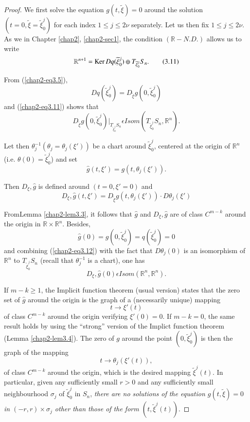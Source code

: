 \begin{proof}
We first solve the equation $g(t, \widetilde{\xi}) = 0$ around the
solution $(t = 0, \widetilde{\xi} = \widetilde{\xi}_{0}^{j})$ for each
index $1 \leq j \leq 2\nu$ separately. Let us then fix $1 \leq j \leq
2\nu$. As we in Chapter \ref{chap2}, \ref{chap2-sec1}, the condition
$(\mathbb{R}-N.D.)$ allows us to write
\begin{equation*}
\mathbb{R}^{n+1} = \operatorname{Ker} Dq (\widetilde{\xi}_{0}^{j}) \oplus
T_{\widetilde{\xi}_{0}^{j}} S_{n}.\tag{3.11}\label{chap2-eq3.11}
\end{equation*}

From (\ref{chap2-eq3.5}),
$$
Dq(\widetilde{\xi}_{0}^{j}) = D_{\widetilde{\xi}}g(0, \widetilde{\xi}_{0}^{j})
$$
and (\ref{chap2-eq3.11}) shows that
\begin{equation*}
D_{\widetilde{\xi}}g(0, \widetilde{\xi}_{0}^{j}) |_{
T_{\widetilde{\xi}_{0}^{j}} S_{n}} \epsilon Isom
(T_{\widetilde{\xi}_{0}^{j}} S_{n},
\mathbb{R}^{n}).\tag{3.12}\label{chap2-eq3.12}
\end{equation*}

Let then $\theta_{j}^{-1} (\theta_{j} = \theta_{j}(\xi'))$ be a chart
around $\widetilde{\xi}_{0}^{j}$, centered at the origin of
$\mathbb{R}^{n}$ (i.e. $\theta(0) = \widetilde{\xi}_{0}^{j}$) and set
$$
\hat{g}(t, \xi') = g(t, \theta_{j}(\xi')).
$$

Then $D_{\xi}, \hat{g}$ is defined around $(t = 0, \xi' = 0)$ and
$$
D_{\xi}, \hat{g}(t, \xi') = D_{\widetilde{\xi}}g(t, \theta_{j}(\xi'))
\cdot D\theta_{j}(\xi')
$$

From\pageoriginale Lemma \ref{chap2-lem3.3}, it follows that $\hat{g}$
and $D_{\xi}, \hat{g}$ are of class $C^{m-k}$ around the origin in
$\mathbb{R} \times \mathbb{R}^{n}$. Besides,
$$
\hat{g}(0) = g(0, \widetilde{\xi}_{0}^{j}) =
q(\widetilde{\xi}_{0}^{j}) = 0
$$
and combining (\ref{chap2-eq3.12}) with the fact that $D\theta_{j}(0)$
is an isomorphism of $\mathbb{R}^{n}$ to $T_{\widetilde{\xi}_{0}^{j}}
S_{n}$ (recall that $\theta_{j}^{-1}$ is a chart), one has
$$
D_{\xi}, \hat{g}(0) \epsilon Isom (\mathbb{R}^{n}, \mathbb{R}^{n}).
$$

If $m - k \geq 1$, the Implicit function theorem (usual version)
states that the zero set of $\hat{g}$ around the origin is the graph
of a (necessarily unique) mapping
$$
t \to \xi'(t)
$$
of class $C^{m-k}$ around the origin verifying $\xi'(0) = 0$. If $m-k
= 0$, the same result holds by using the ``strong'' version of the
Implict function theorem (Lemma \ref{chap2-lem3.4}). The zero of $g$
around the point $(0, \widetilde{\xi}_{0}^{j})$ is then the graph of
the mapping
$$
t \to \theta_{j}(\xi'(t)),
$$
of class $C^{m-k}$ around the origin, which is the desired mapping
$\widetilde{\xi}^{j}(t)$. In particular, given any sufficiently small
$r > 0$ and any sufficiently small neighbourhood $\sigma_{j}$ of
$\widetilde{\xi}_{0}^{j}$ in $S_{n}$, {\em there are no solutions of
  the equation $g(t, \widetilde{\xi}) = 0$ in $(-r, r) \times
  \sigma_{j}$ other than those of the form $(t, \widetilde{\xi}^{j}
  (t))$}.


\end{proof}
